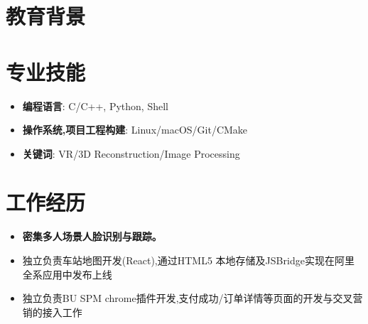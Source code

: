 \documentclass{resume}
\begin{document}




\section{教育背景}

\vspace{0.5em}

\section{专业技能}
\begin{itemize}[parsep=0.5ex]
  \item \textbf{编程语言}: C/C++, Python, Shell
  \item \textbf{操作系统,项目工程构建}: Linux/macOS/Git/CMake
  \item \textbf{关键词}: VR/3D Reconstruction/Image Processing
\end{itemize}


\section{工作经历}
\begin{itemize}
  \item \textbf{密集多人场景人脸识别与跟踪。}
  \item 独立负责车站地图开发(React),通过HTML5 本地存储及JSBridge实现在阿里全系应用中发布上线
  \item 独立负责BU SPM chrome插件开发,支付成功/订单详情等页面的开发与交叉营销的接入工作
\end{itemize}
\end{document}
